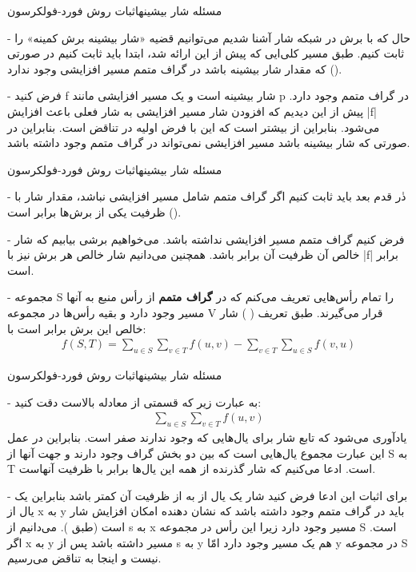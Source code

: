 \begin{itemframe}{مسئله شار بیشینه}{اثبات روش فورد-فولکرسون}
\item[-]
حال که با برش در شبکه شار آشنا شدیم می‌توانیم قضیه «شار بیشینه برش کمینه» را ثابت کنیم. طبق مسیر کلی‌ایی که پیش از این ارائه شد، ابتدا باید ثابت کنیم در صورتی که مقدار شار بیشینه باشد در گراف متمم مسیر افزایشی وجود ندارد ().
\item[-]
فرض کنید f شار بیشینه است و یک مسیر افزایشی مانند p در گراف متمم وجود دارد. پیش از این دیدیم که افزودن شار مسیر افزایشی به شار فعلی باعث افزایش |f| می‌شود. بنابراین   از  بیشتر است که این با فرض اولیه در تناقض است. بنابراین در صورتی که شار بیشینه باشد مسیر افزایشی نمی‌تواند در گراف متمم وجود داشته باشد.
\end{itemframe}
\begin{itemframe}{مسئله شار بیشینه}{اثبات روش فورد-فولکرسون}
\item[-]
دٰر قدم بعد باید ثابت کنیم اگر گراف متمم شامل مسیر افزایشی نباشد، مقدار شار با ظرفیت یکی از برش‌ها برابر است ().
\item[-]
فرض کنیم گراف متمم مسیر افزایشی نداشته باشد. می‌خواهیم برشی بیابیم که شار خالص آن  ظرفیت آن برابر باشد. همچنین می‌دانیم شار خالص هر برش نیز با |f| برابر است.
\item[-]
مجموعه S را تمام رأس‌هایی تعریف می‌کنم که در \textbf{گراف متمم} از رأس منبع به آنها مسیر وجود دارد و بقیه رأس‌ها در مجموعه V قرار می‌گیرند. طبق تعریف (  ) شار خالص این برش برابر است با:
\begin{align*}
f(S, T) = \sum_{u \in S} \sum_{v \in T} f(u, v) - \sum_{v \in T} \sum_{u \in S} f(v, u)
\end{align*}
\end{itemframe}
\begin{itemframe}{مسئله شار بیشینه}{اثبات روش فورد-فولکرسون}
\item[-]
به عبارت زیر که قسمتی از معادله بالاست دقت کنید:
\begin{align*}
\sum_{u \in S} \sum_{v \in T} f(u, v)
\end{align*}
یادآوری می‌شود که تابع شار برای یال‌هایی که وجود ندارند صفر است. بنابراین در عمل این عبارت مجموع یال‌هایی است که بین دو بخش گراف وجود دارند و جهت آنها از S به T است. ادعا می‌کنیم که شار گذرنده از همه این یال‌ها برابر با ظرفیت آنهاست.
\item[-]
برای اثبات این ادعا فرض کنید شار یک یال از
به
از ظرفیت آن کمتر باشد بنابراین یک یال از x به y باید در گراف متمم وجود داشته باشد که نشان دهنده امکان افزایش شار است (طبق ). می‌دانیم از s به x مسیر وجود دارد زیرا این رأس در مجموعه S است. اگر x به y مسیر داشته باشد پس از s به y هم یک مسیر وجود دارد امّا y در مجموعه S نیست و اینجا به تناقض می‌رسیم.

\end{itemframe}
